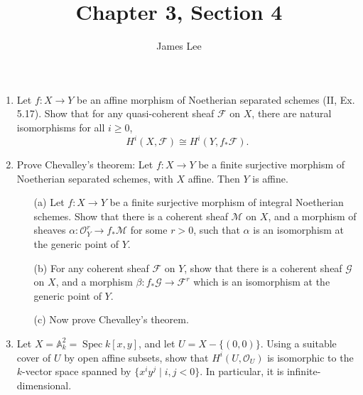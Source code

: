 \documentclass{article}
\title{Chapter 3, Section 4}
\author{James Lee}
\newcommand{\fF}{\mathscr{F}}
\newcommand{\fG}{\mathscr{G}}
\newcommand{\fO}{\mathscr{O}}
\newcommand{\fM}{\mathscr{M}}
\newcommand{\A}{\mathbb{A}}
\DeclareMathOperator{\spec}{Spec}
\begin{document}
\maketitle
\begin{enumerate} [label=\textbf{\arabic*.}, leftmargin=0em]

\item Let $f : X \to Y$ be an affine morphism of Noetherian separated schemes (II, Ex. 5.17).
Show that for any quasi-coherent sheaf $\fF$ on $X$, there are natural isomorphisms for all $i \geq 0$,
\begin{equation*}
  H^i(X, \fF) \cong H^i(Y, f_* \fF).
\end{equation*}

\item Prove Chevalley's theorem: Let $f : X \to Y$ be a finite surjective morphism of Noetherian separated schemes, with $X$ affine.
Then $Y$ is affine.
\begin{itemize}
  \item[(a)] Let $f : X \to Y$ be a finite surjective morphism of integral Noetherian schemes.
  Show that there is a coherent sheaf $\fM$ on $X$, and a morphism of sheaves $\alpha : \fO_Y^r \to f_* \fM$ for some $r > 0$, such that $\alpha$ is an isomorphism at the generic point of $Y$.

  \item[(b)] For any coherent sheaf $\fF$ on $Y$, show that there is a coherent sheaf $\fG$ on $X$, and a morphism $\beta : f_* \fG \to \fF^r$ which is an isomorphism at the generic point of $Y$. 

  \item[(c)] Now prove Chevalley's theorem.
\end{itemize}

\item Let $X = \A_k^2 = \spec{k[x, y]}$, and let $U = X - \{ (0, 0) \}$.
Using a suitable cover of $U$ by open affine subsets, show that $H^i(U, \fO_U)$ is isomorphic to the $k$-vector space spanned by $\{ x^i y^j \mid i, j < 0 \}$.
In particular, it is infinite-dimensional.


\end{enumerate}
\end{document}

